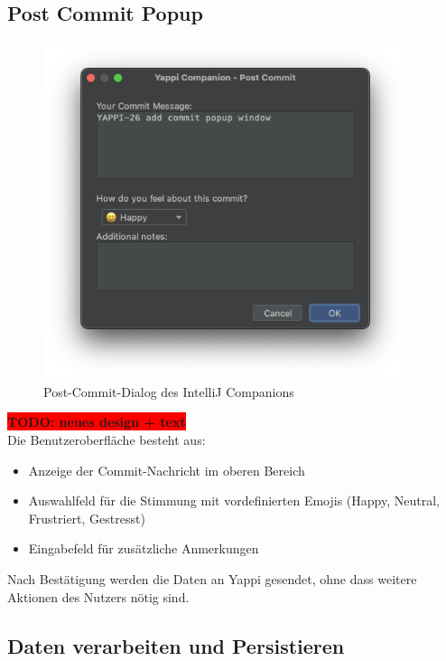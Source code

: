 \documentclass[12pt,a4paper]{report}
\newcommand{\todo}[1]{\colorbox{red}{\textbf{TODO: #1}}\\}
\begin{document}
\subsection{Post Commit Popup}

\begin{figure}[H]
\centering
\includegraphics[width=0.95\textwidth]{../figures/intellij-post-commit.png}
\caption{Post-Commit-Dialog des IntelliJ Companions}
\label{fig:intellij-post-commit}
\end{figure}

\todo{neues design + text}
Die Benutzeroberfläche besteht aus:

\begin{itemize}
    \item Anzeige der Commit-Nachricht im oberen Bereich
    \item Auswahlfeld für die Stimmung mit vordefinierten Emojis (Happy, Neutral, Frustriert, Gestresst)
    \item Eingabefeld für zusätzliche Anmerkungen
\end{itemize}

Nach Bestätigung werden die Daten an Yappi gesendet, ohne dass weitere Aktionen des Nutzers nötig sind.

\subsection{Daten verarbeiten und Persistieren}
\end{document}
